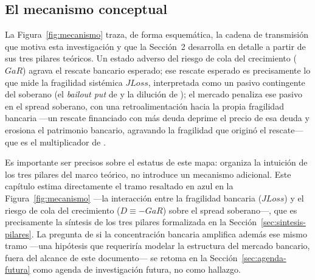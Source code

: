 \subsection{El mecanismo conceptual}
\label{sec:mecanismo-conceptual}

La Figura~\ref{fig:mecanismo} traza, de forma esquemática, la cadena de transmisión que motiva esta investigación y que la Sección~2 desarrolla en detalle a partir de sus tres pilares teóricos. Un estado adverso del riesgo de cola del crecimiento ($GaR$) agrava el rescate bancario esperado; ese rescate esperado es precisamente lo que mide la fragilidad sistémica $JLoss$, interpretada como un pasivo contingente del soberano (el \textit{bailout put} de \citealp{FarhiTirole2018b} y la dilución de \citealp{AcharyaDrechslerSchnabl2014b}); el mercado penaliza ese pasivo en el spread soberano, con una retroalimentación hacia la propia fragilidad bancaria —un rescate financiado con más deuda deprime el precio de esa deuda y erosiona el patrimonio bancario, agravando la fragilidad que originó el rescate— que es el multiplicador de \citet{FarhiTirole2018b}.

Es importante ser precisos sobre el estatus de este mapa: organiza la intuición de los tres pilares del marco teórico, no introduce un mecanismo adicional. Este capítulo estima directamente el tramo resaltado en azul en la Figura~\ref{fig:mecanismo} —la interacción entre la fragilidad bancaria ($JLoss$) y el riesgo de cola del crecimiento ($D\equiv-GaR$) sobre el spread soberano—, que es precisamente la síntesis de los tres pilares formalizada en la Sección~\ref{sec:sintesis-pilares}. La pregunta de si la concentración bancaria amplifica además ese mismo tramo —una hipótesis que requeriría modelar la estructura del mercado bancario, fuera del alcance de este documento— se retoma en la Sección~\ref{sec:agenda-futura} como agenda de investigación futura, no como hallazgo.

